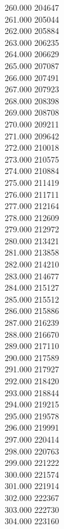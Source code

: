 { 260.000	204647 \\
 261.000	205044 \\
 262.000	205884 \\
 263.000	206235 \\
 264.000	206629 \\
 265.000	207087 \\
 266.000	207491 \\
 267.000	207923 \\
 268.000	208398 \\
 269.000	208708 \\
 270.000	209211 \\
 271.000	209642 \\
 272.000	210018 \\
 273.000	210575 \\
 274.000	210884 \\
 275.000	211419 \\
 276.000	211711 \\
 277.000	212164 \\
 278.000	212609 \\
 279.000	212972 \\
 280.000	213421 \\
 281.000	213858 \\
 282.000	214210 \\
 283.000	214677 \\
 284.000	215127 \\
 285.000	215512 \\
 286.000	215886 \\
 287.000	216239 \\
 288.000	216670 \\
 289.000	217110 \\
 290.000	217589 \\
 291.000	217927 \\
 292.000	218420 \\
 293.000	218844 \\
 294.000	219215 \\
 295.000	219578 \\
 296.000	219991 \\
 297.000	220414 \\
 298.000	220763 \\
 299.000	221222 \\
 300.000	221574 \\
 301.000	221914 \\
 302.000	222367 \\
 303.000	222730 \\
 304.000	223160 \\
}
